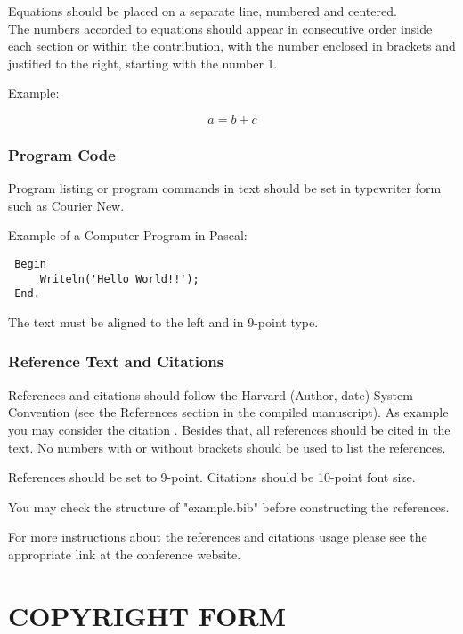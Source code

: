 \documentclass[a4paper,twoside]{article}
\begin{document}
Equations should be placed on a separate line, numbered and
centered.\\The numbers accorded to equations should appear in
consecutive order inside each section or within the contribution,
with the number enclosed in brackets and justified to the right,
starting with the number 1.

Example:

\begin{equation}\label{eq1}
    a=b+c
\end{equation}

\subsubsection{Program Code}\label{subsubsec:program_code}

Program listing or program commands in text should be set in
typewriter form such as Courier New.

Example of a Computer Program in Pascal:

\begin{small}
\begin{verbatim}
 Begin
     Writeln('Hello World!!');
 End.
\end{verbatim}
\end{small}


The text must be aligned to the left and in 9-point type.

\vfill
\subsubsection{Reference Text and Citations}

References and citations should follow the Harvard (Author, date)
System Convention (see the References section in the compiled
manuscript). As example you may consider the citation
\cite{Smith98}. Besides that, all references should be cited in the
text. No numbers with or without brackets should be used to list the
references.

References should be set to 9-point. Citations should be 10-point
font size.

You may check the structure of "example.bib" before constructing the
references.

For more instructions about the references and citations usage
please see the appropriate link at the conference website.

\section{\uppercase{Copyright Form}}
\end{document}
